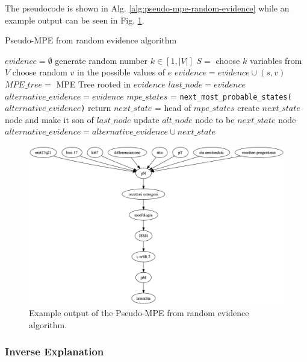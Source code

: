 The pseudocode is shown in Alg. \ref{alg:pseudo-mpe-random-evidence} while an example output can be seen in Fig. \ref{fig:pseudo-mpe-random}.

\begin{algorithm}[htp!]
	\caption{Pseudo-MPE from random evidence algorithm}
	\label{alg:pseudo-mpe-random-evidence}
	\begin{algorithmic}
		\STATE $evidence = \emptyset$
		\STATE generate random number $k \in [ 1, |V| ]$
		\STATE $S = $ choose $k$ variables from $V$
			\STATE choose random $v$ in the possible values of $e$ 
			\STATE $evidence = evidence \cup (s,v)$
		\ENDFOR
		\STATE $MPE\_tree = $ MPE Tree rooted in $evidence$
		\STATE $last\_node = evidence$
		\STATE $alternative\_evidence = evidence$ 
			\STATE $mpe\_states$ = \texttt{next\_most\_probable\_states($alternative\_evidence$)}
				\STATE return
			\ELSE
				\STATE $next\_state$ = head of $mpe\_states$ 
				\STATE create $next\_state$ node and make it son of $last\_node$
				\STATE update $alt\_node$ node to be $next\_state$ node
				\STATE $alternative\_evidence = alternative\_evidence \cup next\_state$
			\ENDIF
		\ENDWHILE
	\end{algorithmic}
\end{algorithm}

\begin{figure}[htbp]
\centerline{\includegraphics[width=\columnwidth]{methodology/images/pseudo-mpe-random-example}}
\caption{Example output of the Pseudo-MPE from random evidence algorithm.}
\label{fig:pseudo-mpe-random}
\end{figure}

\subsubsection{Inverse Explanation}

